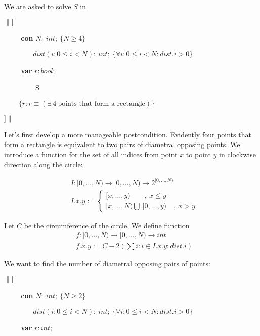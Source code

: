 \noindent We are asked to solve $S$ in \medskip

$\|[$

\verb|    | \textbf{con} $N:\ int;\ \{N \geq 4\}$

\verb|        | $dist(i: 0 \leq i < N):\ int;\ \{\forall i: 0 \leq i < N: dist.i > 0\}$

\verb|    | \textbf{var} $r: bool$;

\verb|        | S

\verb|    | $\{r: r \equiv (\exists\ 4\  \text{points that form a rectangle}) \}$

$]\|$

\medskip

\noindent Let's first develop a more manageable postcondition. Evidently four points that form a rectangle is equivalent to two pairs of diametral opposing points. We introduce a function for the set of all indices from point $x$ to point $y$ in clockwise direction along the circle:

\begin{equation*}
\begin{array}{ll}
& I: [0, \ldots, N) \rightarrow [0, \ldots, N) \rightarrow 2^{[0, \ldots, N)} \\
& I.x.y :=
\begin{cases}
[x, \ldots, y)\qquad,\  x \leq y \\
[x, \ldots, N) \bigcup\  [0, \ldots, y) \quad,\ x > y
 \end{cases}
 \end{array}
\end{equation*}

\noindent Let $C$ be the circumference of the circle.
\noindent We define function
\begin{equation*}
\begin{array}{ll}
   & f : [0, \ldots, N) \rightarrow [0, \ldots, N) \rightarrow int \\
   & f.x.y := C - 2 (\sum i: i \in I.x.y : dist.i)
\end{array}
\end{equation*}

\noindent We want to find the number of diametral opposing pairs of points:\medskip

$\|[$

\verb|    | \textbf{con} $N:\ int;\ \{N \geq 2\}$

\verb|        | $dist(i: 0 \leq i < N):\ int;\ \{\forall i: 0 \leq i < N: dist.i > 0\}$

\verb|    | \textbf{var} $r: int$;

